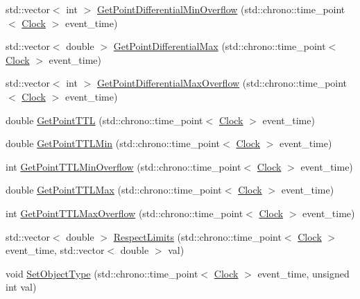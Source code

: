 \begin{DoxyCompactItemize}
\item 
std\+::vector$<$ int $>$ \hyperlink{class_point_adbc225afbd532763617db1acdb81ef4c}{Get\+Point\+Differential\+Min\+Overflow} (std\+::chrono\+::time\+\_\+point$<$ \hyperlink{universe_8h_a0ef8d951d1ca5ab3cfaf7ab4c7a6fd80}{Clock} $>$ event\+\_\+time)
\item 
std\+::vector$<$ double $>$ \hyperlink{class_point_a326cd5742e908f8fb3cf6f3275b5462c}{Get\+Point\+Differential\+Max} (std\+::chrono\+::time\+\_\+point$<$ \hyperlink{universe_8h_a0ef8d951d1ca5ab3cfaf7ab4c7a6fd80}{Clock} $>$ event\+\_\+time)
\item 
std\+::vector$<$ int $>$ \hyperlink{class_point_a2d38599722fbf65afe2b9ac57b0c4bcf}{Get\+Point\+Differential\+Max\+Overflow} (std\+::chrono\+::time\+\_\+point$<$ \hyperlink{universe_8h_a0ef8d951d1ca5ab3cfaf7ab4c7a6fd80}{Clock} $>$ event\+\_\+time)
\item 
double \hyperlink{class_point_a72cf99a391fc3d6ea8f4252f4f92c19f}{Get\+Point\+T\+TL} (std\+::chrono\+::time\+\_\+point$<$ \hyperlink{universe_8h_a0ef8d951d1ca5ab3cfaf7ab4c7a6fd80}{Clock} $>$ event\+\_\+time)
\item 
double \hyperlink{class_point_a272b99a9cd054b09c8944b9f0e657890}{Get\+Point\+T\+T\+L\+Min} (std\+::chrono\+::time\+\_\+point$<$ \hyperlink{universe_8h_a0ef8d951d1ca5ab3cfaf7ab4c7a6fd80}{Clock} $>$ event\+\_\+time)
\item 
int \hyperlink{class_point_a72b222f880df30ebcc12ddc1a6d430b5}{Get\+Point\+T\+T\+L\+Min\+Overflow} (std\+::chrono\+::time\+\_\+point$<$ \hyperlink{universe_8h_a0ef8d951d1ca5ab3cfaf7ab4c7a6fd80}{Clock} $>$ event\+\_\+time)
\item 
double \hyperlink{class_point_a0800eea77109f6fbb1220b4d551a70d3}{Get\+Point\+T\+T\+L\+Max} (std\+::chrono\+::time\+\_\+point$<$ \hyperlink{universe_8h_a0ef8d951d1ca5ab3cfaf7ab4c7a6fd80}{Clock} $>$ event\+\_\+time)
\item 
int \hyperlink{class_point_a61d7e0fb0fd0280f628ea46609082809}{Get\+Point\+T\+T\+L\+Max\+Overflow} (std\+::chrono\+::time\+\_\+point$<$ \hyperlink{universe_8h_a0ef8d951d1ca5ab3cfaf7ab4c7a6fd80}{Clock} $>$ event\+\_\+time)
\item 
std\+::vector$<$ double $>$ \hyperlink{class_point_ac3e94cb7e2ab1d6008ff1d5df00641c2}{Respect\+Limits} (std\+::chrono\+::time\+\_\+point$<$ \hyperlink{universe_8h_a0ef8d951d1ca5ab3cfaf7ab4c7a6fd80}{Clock} $>$ event\+\_\+time, std\+::vector$<$ double $>$ val)
\item 
void \hyperlink{class_point_a3afeb2d7a2e2b7d9406a57fefa1af2ee}{Set\+Object\+Type} (std\+::chrono\+::time\+\_\+point$<$ \hyperlink{universe_8h_a0ef8d951d1ca5ab3cfaf7ab4c7a6fd80}{Clock} $>$ event\+\_\+time, unsigned int val)

\end{DoxyCompactItemize}
